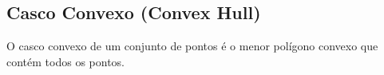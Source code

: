 \subsection{Casco Convexo (Convex Hull)}
O casco convexo de um conjunto de pontos é o menor polígono convexo que contém todos os pontos.